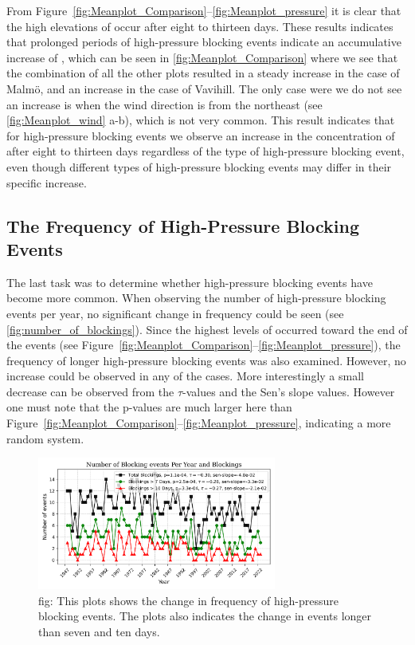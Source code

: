 From Figure~\ref{fig:Meanplot_Comparison}--\ref{fig:Meanplot_pressure} it is clear that the high elevations of \PM occur after eight to thirteen days. These results indicates that prolonged periods of high-pressure blocking events indicate an accumulative increase of \PM, which can be seen in \autoref{fig:Meanplot_Comparison} where we see that the combination of all the other plots resulted in a steady increase in the case of Malmö, and an increase in the case of Vavihill. The only case were we do not see an increase is when the wind direction is from the northeast (see \autoref{fig:Meanplot_wind} a-b), which is not very common. This result indicates that for high-pressure blocking events we observe an increase in the concentration of \PM after eight to thirteen days regardless of the type of high-pressure blocking event, even though different types of high-pressure blocking events may differ in their specific increase.

\subsection{The Frequency of High-Pressure Blocking Events}
The last task was to determine whether high-pressure blocking events have become more common. When observing the number of high-pressure blocking events per year, no significant change in frequency could be seen (see \autoref{fig:number_of_blockings}). Since the highest levels of \PM  occurred toward the end of the events (see Figure~\ref{fig:Meanplot_Comparison}--\ref{fig:Meanplot_pressure}), the frequency of longer high-pressure blocking events was also examined. However, no increase could be observed in any of the cases. More interestingly a small decrease can be observed from the $\tau$-values and the Sen's slope values. However one must note that the p-values are much larger here than Figure~\ref{fig:Meanplot_Comparison}--\ref{fig:Meanplot_pressure}, indicating a more random system. 

\begin{figure}[H]
    \centering
    \includegraphics[width=0.7\textwidth]{Figures/BlockingsPerYear.png}
    \caption{fig: This plots shows the change in frequency of high-pressure blocking events. The plots also indicates the change in events longer than seven and ten days. }
    \label{fig:number_of_blockings}
\end{figure}

